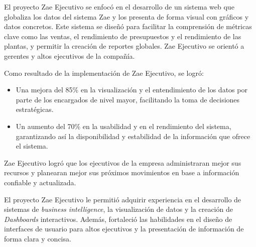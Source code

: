 \documentclass[protocolo.tex]{subfiles}
\begin{document}
El proyecto Zae Ejecutivo se enfocó en el desarrollo de un sistema web que globaliza los datos del sistema Zae y los presenta de forma visual con gráficos  y  datos  concretos.  Este sistema se diseñó para  facilitar  la  comprensión  de  métricas  clave  como  las  ventas,  el  rendimiento  de  presupuestos  y  el  rendimiento  de  las  plantas,  y  permitir  la  creación  de  reportes  globales.  Zae  Ejecutivo  se  orientó  a  gerentes  y  altos  ejecutivos  de  la  compañía.\vspace{4mm}

Como resultado de la implementación de Zae Ejecutivo, se logró:

\begin{itemize}
\item Una mejora del 85\%  en la visualización y el entendimiento de los datos por parte de los encargados de nivel mayor,  facilitando la toma de decisiones estratégicas.
\item Un aumento del 70\% en la usabilidad y en el rendimiento del sistema, garantizando así la disponibilidad y estabilidad de la información que ofrece el sistema.
\end{itemize}

Zae Ejecutivo logró que los ejecutivos de la empresa administraran mejor sus recursos y  planearan mejor  sus  próximos  movimientos  en  base a información confiable  y  actualizada.\vspace{4mm}

El proyecto Zae Ejecutivo le permitió adquirir experiencia en el desarrollo de sistemas de  \textit{business intelligence}, la visualización de datos y la creación de  \textit{Dashboards}  interactivos. Además, fortaleció las habilidades en  el  diseño  de interfaces  de  usuario  para  altos  ejecutivos y la presentación de información de forma clara  y concisa.
\end{document}
